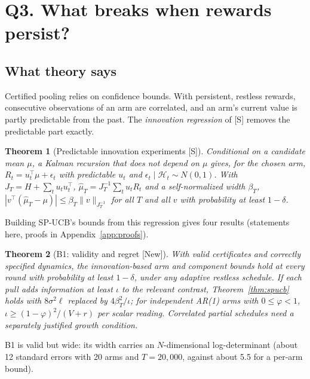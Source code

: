 \documentclass[11pt]{article}
\newtheorem{theorem}{Theorem}
\theoremstyle{definition}
\theoremstyle{remark}
\newcommand{\src}[1]{\textsf{[#1]}}
\begin{document}
\section{Q3. What breaks when rewards persist?}\label{sec:q3}

\subsection{What theory says}

Certified pooling relies on confidence bounds. With persistent, restless rewards, consecutive observations of an arm are correlated, and an arm's current value is partly predictable from the past. The \emph{innovation regression} of \src{S} removes the predictable part exactly.

\begin{theorem}[Predictable innovation experiments \src{S}]\label{thm:innov}
Conditional on a candidate mean $\mu$, a Kalman recursion that does not depend on $\mu$ gives, for the chosen arm, $R_t=u_t^\top\mu+\epsilon_t$ with predictable $u_t$ and $\epsilon_t\mid\mathcal H_t\sim N(0,1)$. With $J_T=H+\sum_tu_tu_t^\top$, $\hat\mu_T=J_T^{-1}\sum_tu_tR_t$ and a self-normalized width $\beta_T$, $|v^\top(\hat\mu_T-\mu)|\le\beta_T\|v\|_{J_T^{-1}}$ for all $T$ and all $v$ with probability at least $1-\delta$.
\end{theorem}

Building SP-UCB's bounds from this regression gives four results (statements here, proofs in Appendix~\ref{app:proofs}).

\begin{theorem}[B1: validity and regret \src{New}]\label{thm:b1}
With valid certificates and correctly specified dynamics, the innovation-based arm and component bounds hold at every round with probability at least $1-\delta$, under any adaptive restless schedule. If each pull adds information at least $\iota$ to the relevant contrast, Theorem~\ref{thm:spucb} holds with $8\sigma^2\ell$ replaced by $4\beta_T^2/\iota$; for independent AR(1) arms with $0\le\varphi<1$, $\iota\ge(1-\varphi)^2/(V+r)$ per scalar reading. Correlated partial schedules need a separately justified growth condition.
\end{theorem}

B1 is valid but wide: its width carries an $N$-dimensional log-determinant (about 12 standard errors with 20 arms and $T=20{,}000$, against about 5.5 for a per-arm bound).
\end{document}

